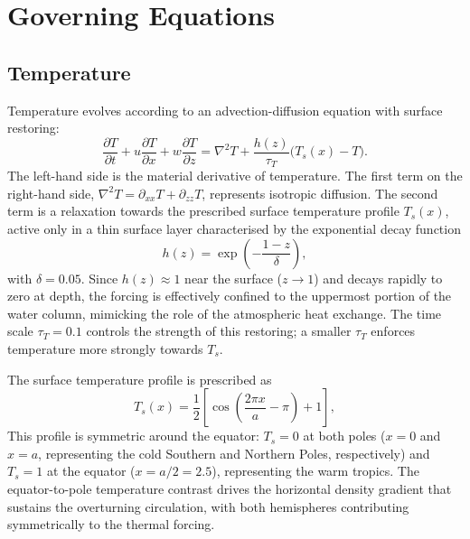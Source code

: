\documentclass[12pt, a4paper]{article}
\newcommand{\pd}[2]{\frac{\partial #1}{\partial #2}}
\newcommand{\lap}{\nabla^2}
\begin{document}
\section{Governing Equations}
\label{sec:equations}

\subsection{Temperature}
\label{sec:temp}

Temperature evolves according to an advection-diffusion equation with surface
restoring:
\begin{equation}
  \pd{T}{t} + u\pd{T}{x} + w\pd{T}{z}
  = \lap T + \frac{h(z)}{\tau_T}\bigl(T_s(x) - T\bigr).
  \label{eq:T}
\end{equation}
The left-hand side is the material derivative of temperature. The first term
on the right-hand side, $\lap T = \partial_{xx}T + \partial_{zz}T$, represents
isotropic diffusion. The second term is a relaxation towards the prescribed
surface temperature profile $T_s(x)$, active only in a thin surface layer
characterised by the exponential decay function
\begin{equation}
  h(z) = \exp\!\left(-\frac{1-z}{\delta}\right),
  \label{eq:h}
\end{equation}
with $\delta = 0.05$. Since $h(z) \approx 1$ near the surface ($z \to 1$) and
decays rapidly to zero at depth, the forcing is effectively confined to the
uppermost portion of the water column, mimicking the role of the atmospheric
heat exchange. The time scale $\tau_T = 0.1$ controls the strength of this
restoring; a smaller $\tau_T$ enforces temperature more strongly towards $T_s$.

The surface temperature profile is prescribed as
\begin{equation}
  T_s(x) = \frac{1}{2}\!\left[\cos\!\left(\frac{2\pi x}{a} - \pi\right) + 1\right],
  \label{eq:Ts}
\end{equation}
This profile is symmetric around the equator: $T_s = 0$ at both poles
($x = 0$ and $x = a$, representing the cold Southern and Northern Poles,
respectively) and $T_s = 1$ at the equator ($x = a/2 = 2.5$), representing
the warm tropics. The equator-to-pole temperature contrast drives the
horizontal density gradient that sustains the overturning circulation, with
both hemispheres contributing symmetrically to the thermal forcing.
\end{document}
